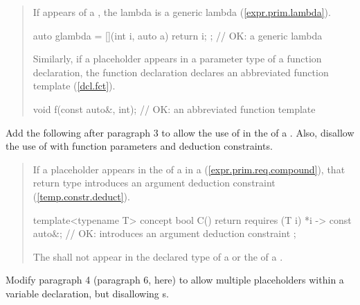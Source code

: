 \begin{quote}
\pnum
If  
appears  
 of a , the lambda 
is a generic lambda
(\ref{expr.prim.lambda}).
%
\enterexample
\begin{codeblock}
auto glambda = [](int i, auto a) { return i; }; // OK: a generic lambda
\end{codeblock}
\exitexample
%
\begin{addedblock}
Similarly, if a placeholder appears in a parameter type of a function 
declaration, the function declaration declares an abbreviated function 
template (\ref{dcl.fct}).
%
\enterexample
\begin{codeblock}
void f(const auto&, int); // OK: an abbreviated function template
\end{codeblock}
\exitexample
\end{addedblock}
\end{quote}


Add the following after paragraph 3 to allow the use of  in the
 of a .
Also, disallow the use of  with function parameters
and deduction constraints.

\begin{quote}
\pnum
If a placeholder appears in the 
of a  in a  
(\ref{expr.prim.req.compound}), that return type introduces an argument 
deduction constraint (\ref{temp.constr.deduct}).
% 
\enterexample
\begin{codeblock}
template<typename T> concept bool C() {
  return requires (T i) { 
    {*i} -> const auto&; // OK: introduces an argument deduction constraint
  };
}
\end{codeblock}
\exitexample

\pnum
The   shall not appear
in the declared type of a  or the
 of a .
\end{quote}


Modify paragraph 4 (paragraph 6, here) to allow multiple placeholders within a 
variable declaration, but disallowing s.

